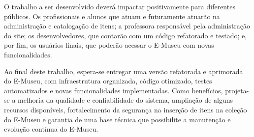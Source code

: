 O trabalho a ser desenvolvido deverá impactar positivamente para diferentes públicos. Os profissionais e alunos que atuam e futuramente atuarão na administração e catalogação de itens; a professora responsável pela administração do site; os desenvolvedores, que contarão com um código refatorado e testado; e, por fim, os usuários finais, que poderão acessar o E-Museu com novas funcionalidades.

Ao final deste trabalho, espera-se entregar uma versão refatorada e aprimorada do E-Museu, com infraestrutura organizada, código otimizado, testes automatizados e novas funcionalidades implementadas. Como benefícios, projeta-se a melhoria da qualidade e confiabilidade do sistema, ampliação de alguns recursos disponíveis, fortalecimento da segurança na inserção de itens na coleção do E-Museu e garantia de uma base técnica que possibilite a manutenção e evolução contínua do E-Museu.

